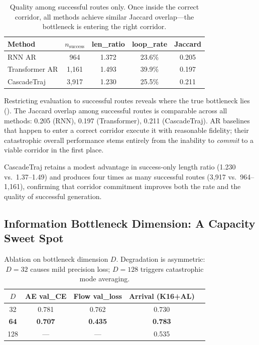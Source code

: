\begin{table}[t]
  \caption{Quality among successful routes only. Once inside the correct corridor, all methods achieve similar Jaccard overlap---the bottleneck is entering the right corridor.}
  \label{tab:success-only}
  \vskip 0.1in
  \centering
  \small
  \begin{tabular}{lcccc}
    \toprule
    Method & $n_{\mathrm{success}}$ & len\_ratio & loop\_rate & Jaccard \\
    \midrule
    RNN AR         & 964  & 1.372 & 23.6\% & 0.205 \\
    Transformer AR & 1{,}161 & 1.493 & 39.9\% & 0.197 \\
    CascadeTraj    & 3{,}917 & 1.230 & 25.5\% & 0.211 \\
    \bottomrule
  \end{tabular}
  \vskip -0.1in
\end{table}

Restricting evaluation to successful routes reveals where the true bottleneck lies ().
The Jaccard overlap among successful routes is comparable across all methods: 0.205 (RNN), 0.197 (Transformer), 0.211 (CascadeTraj).
AR baselines that happen to enter a correct corridor execute it with reasonable fidelity; their catastrophic overall performance stems entirely from the inability to \emph{commit} to a viable corridor in the first place.

CascadeTraj retains a modest advantage in success-only length ratio (1.230 vs.\ 1.37--1.49) and produces four times as many successful routes (3{,}917 vs.\ 964--1{,}161), confirming that corridor commitment improves both the rate and the quality of successful generation.

\subsection{Information Bottleneck Dimension: A Capacity Sweet Spot}
\label{sec:ablation-dim}

\begin{table}[t]
  \caption{Ablation on bottleneck dimension $D$. Degradation is asymmetric: $D\!=\!32$ causes mild precision loss; $D\!=\!128$ triggers catastrophic mode averaging.}
  \label{tab:ablation-dim}
  \vskip 0.1in
  \centering
  \small
  \begin{tabular}{ccccc}
    \toprule
    $D$ & AE val\_CE & Flow val\_loss & Arrival (K16+AL) \\
    \midrule
    32  & 0.781 & 0.762 & 0.730 \\
    \textbf{64}  & \textbf{0.707} & \textbf{0.435} & \textbf{0.783} \\
    128 & ---   & ---   & 0.535 \\
    \bottomrule
  \end{tabular}
  \vskip -0.1in
\end{table}

